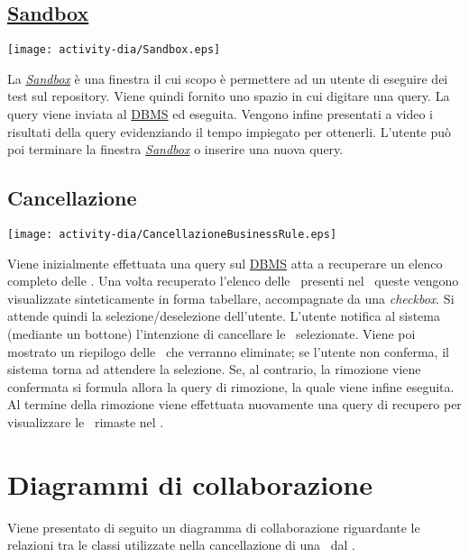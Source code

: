 \subsection{\underline{Sandbox}}
\begin{center}
 \texttt{[image: activity-dia/Sandbox.eps]}
\end{center}
La \textit{\underline{Sandbox}} \`e una finestra il cui scopo \`e permettere ad un utente di eseguire dei test sul repository. Viene quindi fornito uno spazio in cui digitare una query. La query viene inviata al \underline{DBMS} ed eseguita. Vengono infine presentati a video i risultati della query evidenziando il tempo impiegato per ottenerli. L'utente pu\`o poi terminare la finestra \textit{\underline{Sandbox}} o inserire una nuova query.

\subsection{Cancellazione \br}
\begin{center}
 \texttt{[image: activity-dia/CancellazioneBusinessRule.eps]}
\end{center}
Viene inizialmente effettuata una query sul \underline{DBMS} atta a recuperare un elenco completo delle \brs. Una volta recuperato l'elenco delle \brs\ presenti nel \rp\ queste vengono visualizzate sinteticamente in forma tabellare, accompagnate da una \textit{checkbox}. Si attende quindi la selezione/deselezione dell'utente. L'utente notifica al sistema (mediante un bottone) l'intenzione di cancellare le \brs\ selezionate.  Viene poi mostrato un riepilogo delle \brs\ che verranno eliminate; se l'utente non conferma, il sistema torna ad attendere la selezione. Se, al contrario, la rimozione viene confermata si formula allora la query di rimozione, la quale viene infine eseguita. Al termine della rimozione viene effettuata nuovamente una query di recupero per visualizzare le \brs\ rimaste nel \rp.

\section{Diagrammi di collaborazione}
Viene presentato di seguito un diagramma di collaborazione riguardante le relazioni tra le classi utilizzate nella cancellazione di una \br\ dal \rp.

